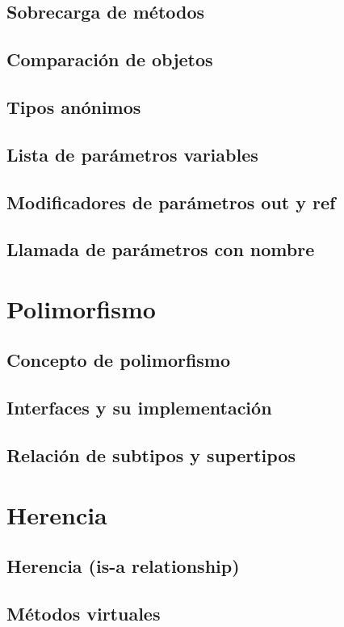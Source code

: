 \documentclass[12pt,a4paper]{report}
\begin{document}
\section{Sobrecarga de métodos}
\section{Comparación de objetos}
\section{Tipos anónimos}
\section{Lista de parámetros variables}
\section{Modificadores de parámetros out y ref}
\section{Llamada de parámetros con nombre}

\chapter{Polimorfismo}
\section{Concepto de polimorfismo}
\section{Interfaces y su implementación}
\section{Relación de subtipos y supertipos}

\chapter{Herencia}
\section{Herencia (is-a relationship)}
\section{Métodos virtuales}
\end{document}
